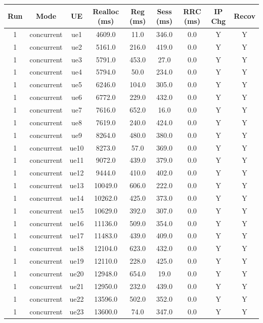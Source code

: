 \begin{table}[ht]
\centering
\begin{tabular}{|c|c|c|c|c|c|c|c|c|}
\hline
Run & Mode & UE & Realloc (ms) & Reg (ms) & Sess (ms) & RRC (ms) & IP Chg & Recov \\
\hline
1 & concurrent & ue1 & 4609.0 & 11.0 & 346.0 & 0.0 & Y & Y \\
1 & concurrent & ue2 & 5161.0 & 216.0 & 419.0 & 0.0 & Y & Y \\
1 & concurrent & ue3 & 5791.0 & 453.0 & 27.0 & 0.0 & Y & Y \\
1 & concurrent & ue4 & 5794.0 & 50.0 & 234.0 & 0.0 & Y & Y \\
1 & concurrent & ue5 & 6246.0 & 104.0 & 305.0 & 0.0 & Y & Y \\
1 & concurrent & ue6 & 6772.0 & 229.0 & 432.0 & 0.0 & Y & Y \\
1 & concurrent & ue7 & 7616.0 & 652.0 & 16.0 & 0.0 & Y & Y \\
1 & concurrent & ue8 & 7619.0 & 240.0 & 424.0 & 0.0 & Y & Y \\
1 & concurrent & ue9 & 8264.0 & 480.0 & 380.0 & 0.0 & Y & Y \\
1 & concurrent & ue10 & 8273.0 & 57.0 & 369.0 & 0.0 & Y & Y \\
1 & concurrent & ue11 & 9072.0 & 439.0 & 379.0 & 0.0 & Y & Y \\
1 & concurrent & ue12 & 9444.0 & 410.0 & 402.0 & 0.0 & Y & Y \\
1 & concurrent & ue13 & 10049.0 & 606.0 & 222.0 & 0.0 & Y & Y \\
1 & concurrent & ue14 & 10262.0 & 425.0 & 373.0 & 0.0 & Y & Y \\
1 & concurrent & ue15 & 10629.0 & 392.0 & 307.0 & 0.0 & Y & Y \\
1 & concurrent & ue16 & 11136.0 & 509.0 & 354.0 & 0.0 & Y & Y \\
1 & concurrent & ue17 & 11483.0 & 439.0 & 409.0 & 0.0 & Y & Y \\
1 & concurrent & ue18 & 12104.0 & 623.0 & 432.0 & 0.0 & Y & Y \\
1 & concurrent & ue19 & 12110.0 & 228.0 & 425.0 & 0.0 & Y & Y \\
1 & concurrent & ue20 & 12948.0 & 654.0 & 19.0 & 0.0 & Y & Y \\
1 & concurrent & ue21 & 12950.0 & 232.0 & 439.0 & 0.0 & Y & Y \\
1 & concurrent & ue22 & 13596.0 & 502.0 & 352.0 & 0.0 & Y & Y \\
1 & concurrent & ue23 & 13600.0 & 74.0 & 347.0 & 0.0 & Y & Y \\

\end{tabular}
\end{table}
